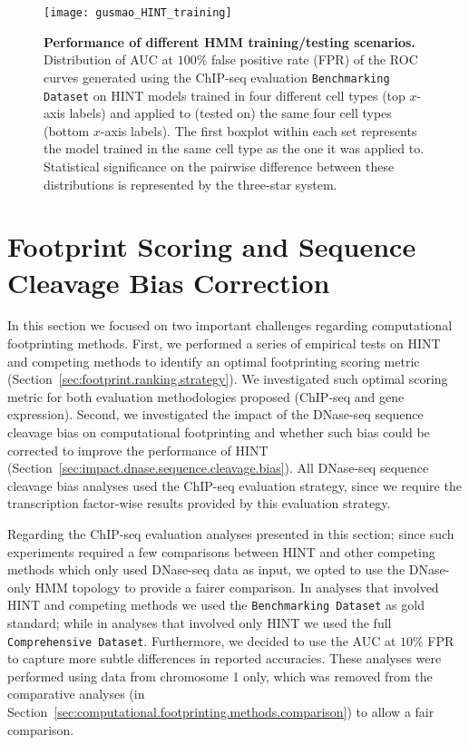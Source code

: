 \begin{figure}[h!]
\centering
\texttt{[image: gusmao\_HINT\_training]}
\caption[Performance of different HMM training/testing scenarios]{\textbf{Performance of different HMM training/testing scenarios.} Distribution of AUC at $100\%$ false positive rate (FPR) of the ROC curves generated using the ChIP-seq evaluation {\tt Benchmarking Dataset} on HINT models trained in four different cell types (top $x$-axis labels) and applied to (tested on) the same four cell types (bottom $x$-axis labels). The first boxplot within each set represents the model trained in the same cell type as the one it was applied to. Statistical significance on the pairwise difference between these distributions is represented by the three-star system.}
\label{fig:gusmao_HINT_training}
\end{figure}

\section{Footprint Scoring and Sequence Cleavage Bias Correction}
\label{sec:second.footrank.biascorr}

In this section we focused on two important challenges regarding computational footprinting methods. First, we performed a series of empirical tests on HINT and competing methods to identify an optimal footprinting scoring metric (Section~\ref{sec:footprint.ranking.strategy}). We investigated such optimal scoring metric for both evaluation methodologies proposed (ChIP-seq and gene expression). Second, we investigated the impact of the DNase-seq sequence cleavage bias on computational footprinting and whether such bias could be corrected to improve the performance of HINT (Section~\ref{sec:impact.dnase.sequence.cleavage.bias}). All DNase-seq sequence cleavage bias analyses used the ChIP-seq evaluation strategy, since we require the transcription factor-wise results provided by this evaluation strategy.

Regarding the ChIP-seq evaluation analyses presented in this section; since such experiments required a few comparisons between HINT and other competing methods which only used DNase-seq data as input, we opted to use the DNase-only HMM topology to provide a fairer comparison. In analyses that involved HINT and competing methods we used the {\tt Benchmarking Dataset} as gold standard; while in analyses that involved only HINT we used the full {\tt Comprehensive Dataset}. Furthermore, we decided to use the AUC at $10\%$ FPR to capture more subtle differences in reported accuracies. These analyses were performed using data from chromosome 1 only, which was removed from the comparative analyses (in Section~\ref{sec:computational.footprinting.methods.comparison}) to allow a fair comparison.

